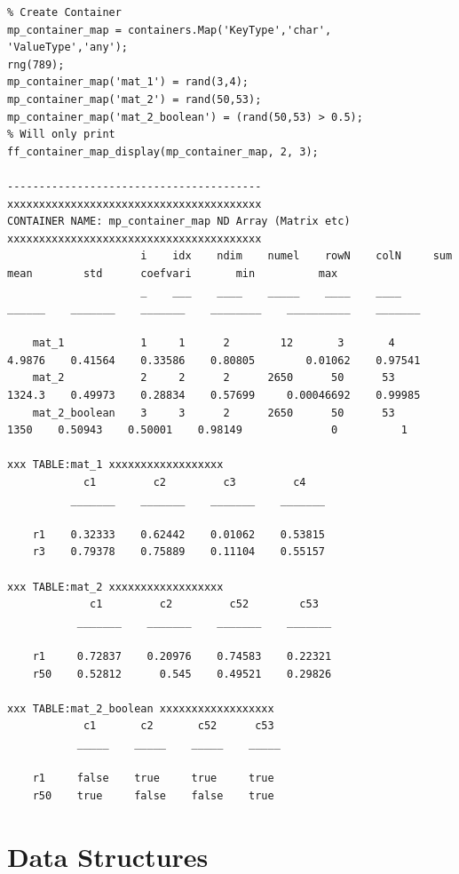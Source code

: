 \documentclass[
]{book}
\begin{document}
\begin{verbatim}
% Create Container
mp_container_map = containers.Map('KeyType','char', 'ValueType','any');
rng(789);
mp_container_map('mat_1') = rand(3,4);
mp_container_map('mat_2') = rand(50,53);
mp_container_map('mat_2_boolean') = (rand(50,53) > 0.5);
% Will only print 
ff_container_map_display(mp_container_map, 2, 3);

----------------------------------------
xxxxxxxxxxxxxxxxxxxxxxxxxxxxxxxxxxxxxxxx
CONTAINER NAME: mp_container_map ND Array (Matrix etc)
xxxxxxxxxxxxxxxxxxxxxxxxxxxxxxxxxxxxxxxx
                     i    idx    ndim    numel    rowN    colN     sum       mean        std      coefvari       min          max  
                     _    ___    ____    _____    ____    ____    ______    _______    _______    ________    __________    _______

    mat_1            1     1      2        12       3       4     4.9876    0.41564    0.33586    0.80805        0.01062    0.97541
    mat_2            2     2      2      2650      50      53     1324.3    0.49973    0.28834    0.57699     0.00046692    0.99985
    mat_2_boolean    3     3      2      2650      50      53       1350    0.50943    0.50001    0.98149              0          1

xxx TABLE:mat_1 xxxxxxxxxxxxxxxxxx
            c1         c2         c3         c4   
          _______    _______    _______    _______

    r1    0.32333    0.62442    0.01062    0.53815
    r3    0.79378    0.75889    0.11104    0.55157

xxx TABLE:mat_2 xxxxxxxxxxxxxxxxxx
             c1         c2         c52        c53  
           _______    _______    _______    _______

    r1     0.72837    0.20976    0.74583    0.22321
    r50    0.52812      0.545    0.49521    0.29826

xxx TABLE:mat_2_boolean xxxxxxxxxxxxxxxxxx
            c1       c2       c52      c53 
           _____    _____    _____    _____

    r1     false    true     true     true 
    r50    true     false    false    true 
\end{verbatim}

\hypertarget{data-structures}{%
\chapter{Data Structures}\label{data-structures}}
\end{document}
